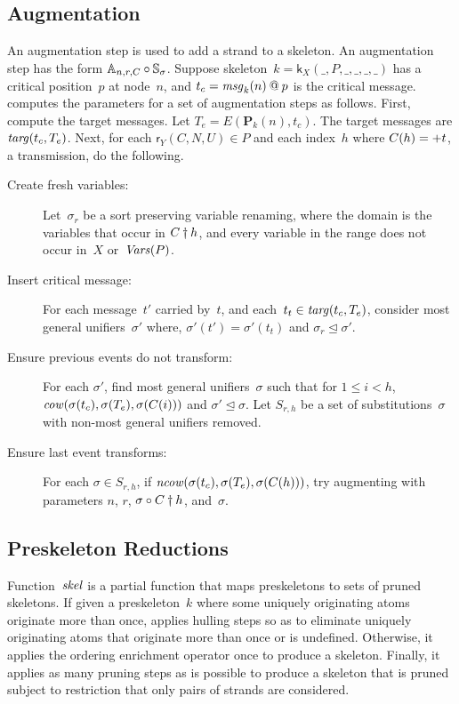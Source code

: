 \documentclass[12pt]{article}
\theoremstyle{definition}
\newcommand{\pubmsg}{\mathbf{P}}
\newcommand{\mcow}{\fn{cow}}
\newcommand{\mncow}{\fn{ncow}}
\newcommand{\svars}{\fn{Vars}}
\newcommand{\msg}{\fn{msg}}
\newcommand{\role}{\mathsf{r}}
\newcommand{\skel}{\mathsf{k}}
\begin{document}
\subsection{Augmentation}\label{sec:aug step}

An augmentation step is used to add a strand to a skeleton.  An
augmentation step has the form
${\mathord{\mathbb A_{n,r,C}}}\circ{\mathord{\ensuremath{\mathbb S}_\sigma}}$.  Suppose
skeleton~$k=\skel_X(\_,P,\_,\_,\_,\_)$ has a critical position~$p$ at
node~$n$, and $t_c=\msg_k(n)\termat p$ is the critical message.
{\cpsa} computes the parameters for a set of augmentation steps as
follows.  First, compute the target messages.  Let
$T_e=E(\pubmsg_k(n), t_c)$.  The target messages are $\operatorname{\mathit{targ}}(t_c,
T_e)$.  Next, for each $\role_Y(C,N,U)\in P$ and each index~$h$ where
$C(h)=\mathord + t$, a transmission, do the following.
\begin{description}
\item[Create fresh variables:]
Let~$\sigma_r$ be a sort preserving variable renaming,
where the domain is the variables that occur in $C\dagger h$, and every
variable in the range does not occur in~$X$ or~$\svars(P)$.

\item[Insert critical message:] For each message~$t'$ carried by~$t$,
  and each~$t_t\in \operatorname{\mathit{targ}}(t_c, T_e)$, consider most general unifiers~$\sigma'$
  where, $\sigma'(t')=\sigma'(t_t)$ and $\sigma_r\unlhd\sigma'$.

\item[Ensure previous events do not transform:] For each $\sigma'$, find
  most general unifiers~$\sigma$ such that for $1\leq i<h$,
  $\mcow(\sigma(t_c), \sigma(T_e), \sigma(C(i)))$ and
  $\sigma'\unlhd\sigma$.  Let $S_{r,h}$ be a set of
  substitutions~$\sigma$ with non-most general unifiers removed.

\item[Ensure last event transforms:] For each $\sigma\in S_{r,h}$,
if $\mncow(\sigma(t_c),\sigma(T_e),\sigma(C(h)))$, try
augmenting with parameters $n$, $r$, $\sigma\circ C\dagger h$,
and~$\sigma$.
\end{description}

\subsection{Preskeleton Reductions}

Function~$\operatorname{\mathit{skel}}$ is a partial function that maps preskeletons to
sets of pruned skeletons.  If given a preskeleton~$k$ where some uniquely
originating atoms originate more than once,  applies hulling
steps so as to eliminate uniquely originating atoms that originate
more than once or is undefined.  Otherwise, it applies the ordering
enrichment operator once to produce a skeleton.  Finally, it applies
as many pruning steps as is possible to produce a skeleton that is
pruned subject to restriction that only pairs of strands are
considered.
\end{document}
